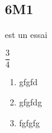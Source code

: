 \subsection*{6M1}

 est un essai

$\dfrac{3}{4}$

\begin{enumerate}
	\item gfgfd
	\item gfgfdg
	\item fgfgfg
\end{enumerate}
